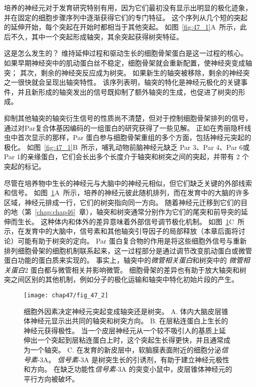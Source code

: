 培养的神经元对于发育研究特别有用，因为它们最初没有显示出明显的极化迹象，并在固定的细胞步骤序列中逐渐获得它们的专门特征。
这个序列从几个短的突起的延伸开始，每个突起在开始时都相当于其他突起。
如图~\ref{fig:47_1}A~所示，此后不久，其中一个突起形成轴突，其余突起获得树突特征。


这是怎么发生的？
维持延伸过程和驱动生长的细胞骨架蛋白是这一过程的核心。
如果早期神经突中的肌动蛋白丝不稳定，细胞骨架就会重新配置，使神经突变成轴突；
其次，剩余的神经突反应成为树突。
如果新生的轴突被移除，剩余的神经突之一很快就会呈现出轴突特性。
该序列表明，轴突的特化是神经元极化的关键事件，并且新形成的轴突发出的信号既抑制了额外轴突的生成，也促进了树突的形成。


抑制其他轴突的轴突衍生信号的性质尚不清楚，但对于控制细胞骨架排列的信号，通过对Par复合体基因编码的一组蛋白的研究获得了一些见解。
正如在秀丽隐杆线虫中首次显示的那样，Par 蛋白参与细胞骨架重组的多个方面，包括神经元突起的极化。
如图~\ref{fig:47_1}B~所示，哺乳动物前脑神经元缺乏 Par 3、Par 4、Par 6或Par 1的亲缘蛋白，它们会长出多个长度介于轴突和树突之间的突起，并带有 2 个突起的标记。


尽管在培养物中生长的神经元与大脑中的神经元相似，但它们缺乏关键的外部线索和信号。
如图~\ref{fig:47_2}A~所示，培养的神经元彼此随机排列，而在发育中的大脑的许多区域，神经元排成一行，它们的树突指向同一方向。
随着神经元迁移到它们的目的地（第~\ref{chap:chap46}~章），轴突和树突通常分别作为它们的尾突和前导突的延伸而生长。
这种体内和体外的差异意味着外部信号调节极化机制。
如图~\ref{fig:47_2}C~所示，在发育中的大脑中，信号素和其他轴突引导因子的局部释放（本章后面将讨论）可能有助于树突的定向。
Par 蛋白复合物的作用是将这些细胞外信号与重新排列细胞骨架的细胞机制联系起来，这一过程部分是通过调节改变肌动蛋白或微管蛋白功能的蛋白质来实现的。
事实上，轴突中的\textit{微管相关蛋白}和树突中的 \textit{微管相关蛋白}2 蛋白都与微管相关并影响微管。
细胞骨架的差异也有助于放大轴突和树突之间区别的其他机制，例如分子的极化运输和轴突中特化初始片段的产生。


\begin{figure}[htbp]
	\centering
	\texttt{[image: chap47/fig\_47\_2]}
	\caption{细胞外因素决定神经元突起变成轴突还是树突。
		A. 体内大脑皮层锥体神经元显示出共同的轴突和树突方向。
		B. 在层粘连蛋白上生长的神经元获得极性。
		当一个皮层神经元从一个较不吸引人的基质上延伸出一个突起到层粘连蛋白上时，这个突起生长得更快，并且通常成为一个轴突。
		C. 在发育的新皮层中，软脑膜表面附近的细胞分泌\textit{信号素}-3A。
		\textit{信号素}-3A 是树突生长的引诱剂，有助于建立神经元极性和方向。
		在缺乏功能性\textit{信号素}-3A 的突变小鼠中，皮层锥体神经元的平行方向被破坏。}
	\label{fig:47_2}
\end{figure}


